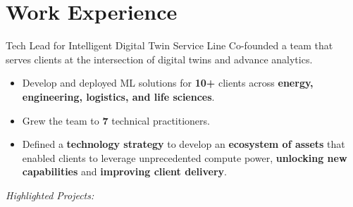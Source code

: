 \documentclass[a4paper]{deedy-resume} %
\begin{document}
\section{Work Experience}
\vspace{-5pt}
\begin{callout}{Tech Lead for Intelligent Digital Twin Service Line}
\linebreak
    Co-founded a team that serves clients at the intersection of digital twins and advance analytics.
    \vspace{-10pt}
    \begin{multicols}{2}
        \begin{itemize}
            \item Develop and deployed ML solutions for \textbf{10+} clients across \textbf{energy, engineering, logistics, and life sciences}. 
            \item Grew the team to \textbf{7} technical practitioners.
            \columnbreak
            \item Defined a \textbf{technology strategy} to develop an \textbf{ecosystem of assets} that enabled clients to leverage unprecedented compute power, \textbf{unlocking new capabilities} and \textbf{improving client delivery}.
        \end{itemize}
    \end{multicols}
\end{callout}
\vspace{-2pt}
\textit{Highlighted Projects:}
\vspace{-10pt}
\end{document}
